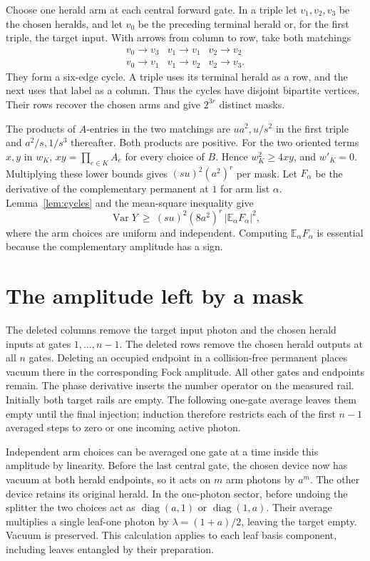 \documentclass[11pt]{article}
\DeclareMathOperator{\Var}{Var}
\newcommand{\E}{\mathbb E}
\begin{document}
Choose one herald arm at each central forward gate. In a triple let \(v_1,v_2,v_3\) be the chosen heralds, and let \(v_0\) be the preceding terminal herald or, for the first triple, the target input. With arrows from column to row, take both matchings
\[
\begin{array}{ccc}
 v_0\to v_3 & v_1\to v_1 & v_2\to v_2\\
 v_0\to v_1 & v_1\to v_2 & v_2\to v_3 .
\end{array}
\]
They form a six-edge cycle. A triple uses its terminal herald as a row, and the next uses that label as a column. Thus the cycles have disjoint bipartite vertices. Their rows recover the chosen arms and give \(2^{3r}\) distinct masks.

The products of \(A\)-entries in the two matchings are \(ua^2,u/s^2\) in the first triple and \(a^2/s,1/s^3\) thereafter. Both products are positive. For the two oriented terms \(x,y\) in \(w_K\), \(xy=\prod_{e\in K}A_e\) for every choice of \(B\). Hence \(w_K^2\ge4xy\), and \(w'_K=0\). Multiplying these lower bounds gives \((su)^2(a^2)^r\) per mask. Let \(F_\alpha\) be the derivative of the complementary permanent at \(1\) for arm list \(\alpha\). Lemma~\ref{lem:cycles} and the mean-square inequality give
\begin{equation}
 \Var Y\ \ge\ (su)^2(8a^2)^r\,|\E_\alpha F_\alpha|^2, \label{eq:bound}
\end{equation}
where the arm choices are uniform and independent. Computing \(\E_\alpha F_\alpha\) is essential because the complementary amplitude has a sign.

\section{The amplitude left by a mask}
The deleted columns remove the target input photon and the chosen herald inputs at gates \(1,\ldots,n-1\). The deleted rows remove the chosen herald outputs at all \(n\) gates. Deleting an occupied endpoint in a collision-free permanent places vacuum there in the corresponding Fock amplitude. All other gates and endpoints remain. The phase derivative inserts the number operator on the measured rail. Initially both target rails are empty. The following one-gate average leaves them empty until the final injection; induction therefore restricts each of the first \(n-1\) averaged steps to zero or one incoming active photon.

Independent arm choices can be averaged one gate at a time inside this amplitude by linearity. Before the last central gate, the chosen device now has vacuum at both herald endpoints, so it acts on \(m\) arm photons by \(a^m\). The other device retains its original herald. In the one-photon sector, before undoing the splitter the two choices act as \(\operatorname{diag}(a,1)\) or \(\operatorname{diag}(1,a)\). Their average multiplies a single leaf-one photon by \(\lambda=(1+a)/2\), leaving the target empty. Vacuum is preserved. This calculation applies to each leaf basis component, including leaves entangled by their preparation.
\end{document}
